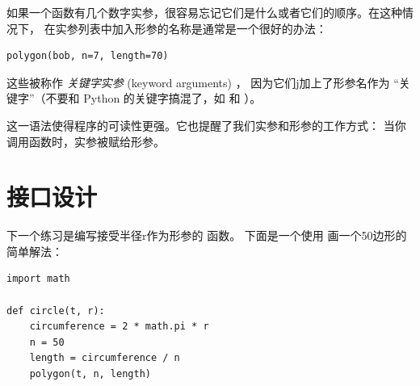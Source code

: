 如果一个函数有几个数字实参，很容易忘记它们是什么或者它们的顺序。在这种情况下，
在实参列表中加入形参的名称是通常是一个很好的办法：

\begin{lstlisting}
polygon(bob, n=7, length=70)
\end{lstlisting}


这些被称作 \emph{关键字实参} (keyword arguments) ，
因为它们j加上了形参名作为 ``关键字''（不要和 Python 的关键字搞混了，如  和  ）。
  


这一语法使得程序的可读性更强。它也提醒了我们实参和形参的工作方式：
当你调用函数时，实参被赋给形参。

\section{接口设计}


下一个练习是编写接受半径r作为形参的  函数。
下面是一个使用  画一个50边形的简单解法：

\begin{lstlisting}
import math

def circle(t, r):
    circumference = 2 * math.pi * r
    n = 50
    length = circumference / n
    polygon(t, n, length)
\end{lstlisting}


